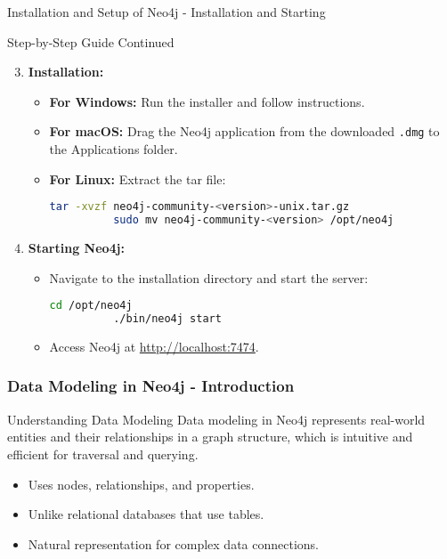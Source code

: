 \documentclass[aspectratio=169]{beamer}
\begin{document}
\begin{frame}[fragile]{Installation and Setup of Neo4j - Installation and Starting}
  \begin{block}{Step-by-Step Guide Continued}
    \begin{enumerate}
      \setcounter{enumi}{2}
      \item \textbf{Installation:}
        \begin{itemize}
          \item \textbf{For Windows:} Run the installer and follow instructions.
          \item \textbf{For macOS:} Drag the Neo4j application from the downloaded \texttt{.dmg} to the Applications folder.
          \item \textbf{For Linux:} Extract the tar file:
          \begin{lstlisting}[language=bash]
          tar -xvzf neo4j-community-<version>-unix.tar.gz
          sudo mv neo4j-community-<version> /opt/neo4j
          \end{lstlisting}
        \end{itemize}

      \item \textbf{Starting Neo4j:}
        \begin{itemize}
          \item Navigate to the installation directory and start the server:
          \begin{lstlisting}[language=bash]
          cd /opt/neo4j
          ./bin/neo4j start
          \end{lstlisting}
          \item Access Neo4j at \url{http://localhost:7474}.
        \end{itemize}
    \end{enumerate}
  \end{block}
\end{frame}

\begin{frame}[fragile]
    \frametitle{Data Modeling in Neo4j - Introduction}
    \begin{block}{Understanding Data Modeling}
        Data modeling in Neo4j represents real-world entities and their relationships in a graph structure, which is intuitive and efficient for traversal and querying.
        \begin{itemize}
            \item Uses nodes, relationships, and properties.
            \item Unlike relational databases that use tables.
            \item Natural representation for complex data connections.
        \end{itemize}
    \end{block}
\end{frame}
\end{document}
